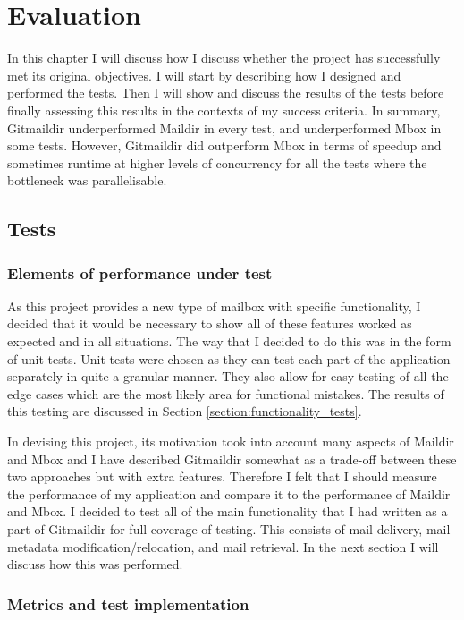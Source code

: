 \chapter{Evaluation} \label{section:evaluation}

In this chapter I will discuss how I discuss whether the project has successfully met its original objectives. I will start by describing how I designed and performed the tests. Then I will show and discuss the results of the tests before finally assessing this results in the contexts of my success criteria. In summary, Gitmaildir underperformed Maildir in every test, and underperformed Mbox in some tests. However, Gitmaildir did outperform Mbox in terms of speedup and sometimes runtime at higher levels of concurrency for all the tests where the bottleneck was parallelisable.

\section{Tests}

\subsection{Elements of performance under test}

As this project provides a new type of mailbox with specific functionality, I decided that it would be necessary to show all of these features worked as expected and in all situations. The way that I decided to do this was in the form of unit tests. Unit tests were chosen as they can test each part of the application separately in quite a granular manner. They also allow for easy testing of all the edge cases which are the most likely area for functional mistakes. The results of this testing are discussed in Section \ref{section:functionality_tests}.

In devising this project, its motivation took into account many aspects of Maildir and Mbox and I have described Gitmaildir somewhat as a trade-off between these two approaches but with extra features. Therefore I felt that I should measure the performance of my application and compare it to the performance of Maildir and Mbox. I decided to test all of the main functionality that I had written as a part of Gitmaildir for full coverage of testing. This consists of mail delivery, mail metadata modification/relocation, and mail retrieval. In the next section I will discuss how this was performed.

\subsection{Metrics and test implementation}

